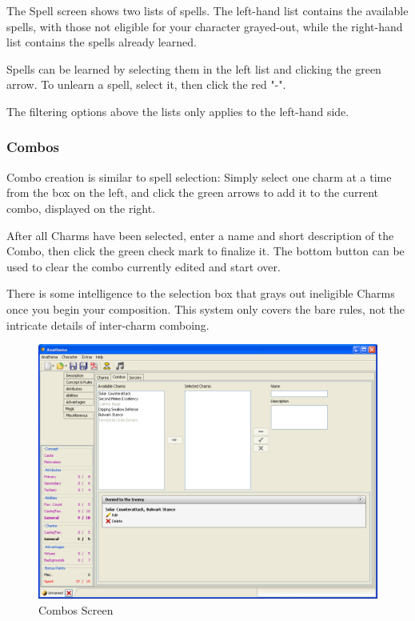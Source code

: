 The Spell screen shows two lists of spells. The left-hand list contains the available spells, with those not eligible for your character grayed-out, while the right-hand list contains the spells already learned.

Spells can be learned by selecting them in the left list and clicking the green arrow. To unlearn a spell, select it, then click the red "-". 

The filtering options above the lists only applies to the left-hand side.

\subsubsection{Combos}
Combo creation is similar to spell selection: Simply select one charm at a time from the box on the left, and click the green arrows to add it to the current combo, displayed on the right. 

After all Charms have been selected, enter a name and short description of the Combo, then click the green check mark to finalize it. The bottom button can be used to clear the combo currently edited and start over. 

There is some intelligence to the selection box that grays out ineligible Charms once you begin your composition. This system only covers the bare rules, not the intricate details of inter-charm comboing.

\begin{figure}
	\centering
		\includegraphics[width=1.00\textwidth]{images/Combos.png}
	\caption{Combos Screen}
	\label{fig:Combos}
\end{figure}

